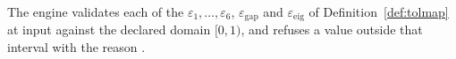 
\begin{requirement}\label{req:tolerance-domain}
The engine validates each of the 
$\varepsilon_1,\dots,\varepsilon_6$, $\varepsilon_{\mathrm{gap}}$ and
$\varepsilon_{\mathrm{eig}}$ of Definition~\ref{def:tolmap} at input against
the declared domain $[0,1)$, and refuses a value outside that interval with the
reason .
\end{requirement}
